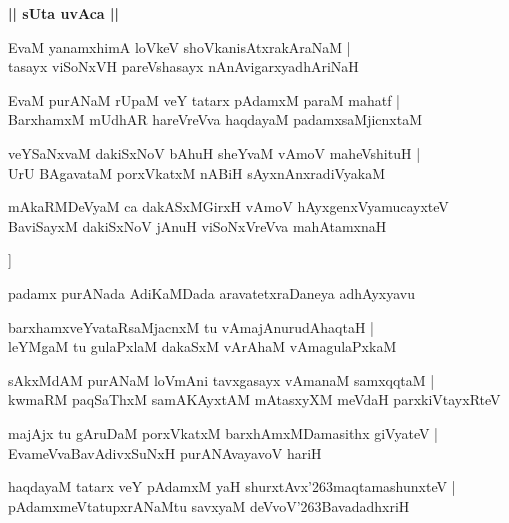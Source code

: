 \documentclass[twoside,12pt,openright]{book}
\def\S{\char'263}
\newcounter{shloka}[chapter]
\def\uvaca#1{\centerline{{\large\textbf{#1}}}}
\begin{document}
\uvaca{|| sUta uvAca ||}

\begin{shloka}
EvaM yanamxhimA loVkeV shoVkanisAtxrakAraNaM |\\
tasayx viSoNxVH pareVshasayx nAnAvigarxyadhAriNaH 
\end{shloka}

\begin{shloka}
EvaM purANaM rUpaM veY tatarx pAdamxM paraM mahatf |\\
BarxhamxM mUdhAR hareVreVva haqdayaM padamxsaMjicnxtaM 
\end{shloka}

\begin{shloka}
veYSaNxvaM dakiSxNoV bAhuH sheYvaM vAmoV maheVshituH |\\
UrU BAgavataM porxVkatxM nABiH sAyxnAnxradiVyakaM 
\end{shloka}

\begin{shloka}
mAkaRMDeVyaM ca dakASxMGirxH vAmoV hAyxgenxVyamucayxteV \\
BaviSayxM dakiSxNoV jAnuH viSoNxVreVva mahAtamxnaH
\end{shloka}]

\begin{center}
padamx purANada AdiKaMDada aravatetxraDaneya adhAyxyavu
\end{center}

\begin{shloka}
barxhamxveYvataRsaMjacnxM tu vAmajAnurudAhaqtaH |\\
leYMgaM tu gulaPxlaM dakaSxM vArAhaM vAmagulaPxkaM 
\end{shloka}

\begin{shloka}
sAkxMdAM purANaM loVmAni tavxgasayx vAmanaM samxqqtaM |\\
kwmaRM paqSaThxM samAKAyxtAM mAtasxyXM meVdaH parxkiVtayxRteV 
\end{shloka}

\begin{shloka}
majAjx tu gAruDaM porxVkatxM barxhAmxMDamasithx giVyateV |\\
EvameVvaBavAdivxSuNxH purANAvayavoV hariH 
\end{shloka}

\begin{shloka}
haqdayaM tatarx veY pAdamxM yaH shurxtAvx\S maqtamashunxteV |\\
pAdamxmeVtatupxrANaMtu savxyaM deVvoV\S BavadadhxriH 
\end{shloka}
\end{document}
